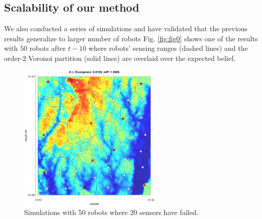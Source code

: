 \documentclass[letterpaper, 10 pt, conference]{ieeeconf}
\begin{document}
\subsection{Scalability of our method}
We also conducted a series of simulations and have validated that the previous results generalize to larger number of robots
Fig. \ref{fig:fig0} shows one of the results with $50$ robots after $t-10$ where robots' sensing ranges (dashed lines) and the order-$2$ Voronoi partition (solid lines) are overlaid over the expected belief.
\begin{figure}
	\centering
	\includegraphics[width=2.7in]{figure/50_order2_last}
	\caption{Simulations with 50 robots where 20 sensors have failed.}
	\label{fig:fig9}
\end{figure}
\end{document}
